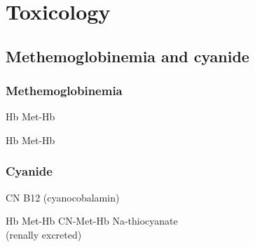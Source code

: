 \documentclass[8pt]{extarticle}
\begin{document}
\newpage

\section{Toxicology}
\subsection{Methemoglobinemia and cyanide}
\subsubsection{Methemoglobinemia}
Hb  Met-Hb

\vfill

Hb  Met-Hb

\vfill

\subsubsection{Cyanide}
CN  B12 (cyanocobalamin)

\vfill

Hb  Met-Hb  CN-Met-Hb  Na-thiocyanate \\ (renally excreted)

\vfill
\end{document}
